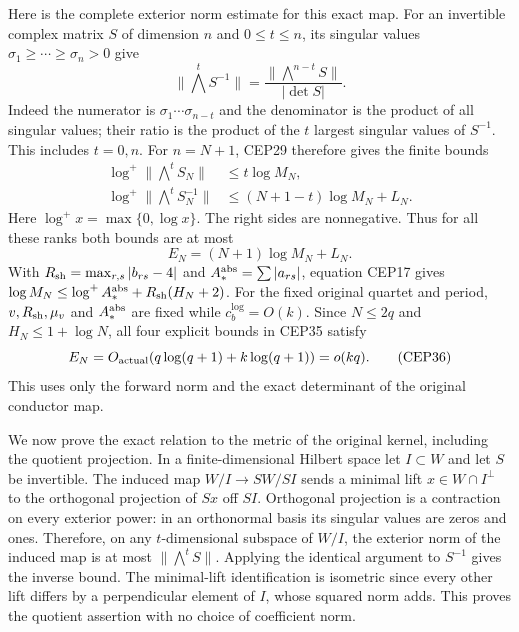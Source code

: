 \documentclass[11pt,a4paper]{article}
\begin{document}
Here is the complete exterior norm estimate for this exact map.
For an invertible complex matrix $S$ of dimension $n$ and
$0\le t\le n$, its singular values
$\sigma_1\ge\cdots\ge\sigma_n>0$ give
\[
 \|\bigwedge^t S^{-1}\|
 =\frac{\|\bigwedge^{n-t}S\|}{|\det S|}.
 \tag{CEP33}
\]
Indeed the numerator is $\sigma_1\cdots\sigma_{n-t}$ and
the denominator is the product of all singular values; their
ratio is the product of the $t$ largest singular values of
$S^{-1}$. This includes $t=0,n$.
For $n=N+1$, CEP29 therefore gives the finite bounds
\[
 \begin{split}
 \log^+\|\bigwedge^t S_N\|&\le t\log M_N,\\
 \log^+\|\bigwedge^t S_N^{-1}\|
        &\le(N+1-t)\log M_N+L_N .
 \end{split}\tag{CEP34}
\]
Here $\log^+x=\max\{0,\log x\}$. The right sides are nonnegative.
Thus for all these ranks both bounds are at most
\[
 E_N=(N+1)\log M_N+L_N.
 \tag{CEP35}
\]
With $R_{\rm sh}=\max_{r,s}|b_{rs}-4|$ and
$A_*^{\rm abs}=\sum|a_{rs}|$, equation CEP17 gives
$\log M_N\le\log^+A_*^{\rm abs}+R_{\rm sh}(H_N+2)$.
For the fixed original quartet and period, $v,R_{\rm sh},\mu_v$
and $A_*^{\rm abs}$ are fixed while $c_b^{\log}=O(k)$.
Since $N\le2q$ and $H_N\le1+\log N$, all four explicit bounds
in CEP35 satisfy
\[
 E_N=O_{\rm actual}(q\log(q+1)+k\log(q+1))=o(kq).
 \tag{CEP36}
\]
This uses only the forward norm and the exact determinant of
the original conductor map.

We now prove the exact relation to the metric of the original
kernel, including the quotient projection. In a finite-dimensional
Hilbert space let $I\subset W$ and let $S$ be invertible.
The induced map $W/I\longrightarrow SW/SI$ sends a minimal lift
$x\in W\cap I^\perp$ to the orthogonal projection of $Sx$
off $SI$. Orthogonal projection is a contraction on every exterior
power: in an orthonormal basis its singular values are zeros and
ones. Therefore, on any $t$-dimensional subspace of $W/I$, the
exterior norm of the induced map is at most
$\|\bigwedge^t S\|$. Applying the identical argument to $S^{-1}$
gives the inverse bound. The minimal-lift identification is
isometric since every other lift differs by a perpendicular
element of $I$, whose squared norm adds. This proves the
quotient assertion with no choice of coefficient norm.
\end{document}
